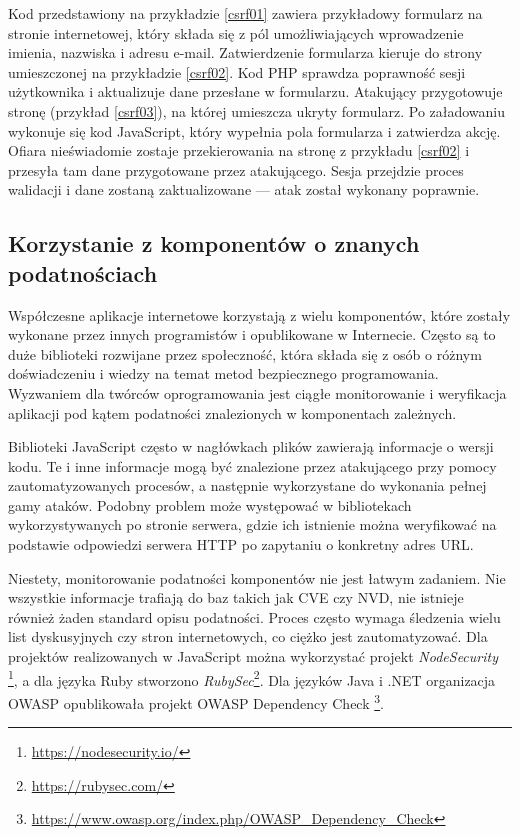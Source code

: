 \documentclass[11pt,a4paper,polish,thesis]{dcsbook}
\begin{document}
Kod przedstawiony na przykładzie \ref{csrf01} zawiera przykładowy formularz na stronie internetowej, który składa się z pól umożliwiających wprowadzenie imienia, nazwiska i adresu e-mail. Zatwierdzenie formularza kieruje do strony umieszczonej na przykładzie \ref{csrf02}. Kod PHP sprawdza poprawność sesji użytkownika i aktualizuje dane przesłane w formularzu. Atakujący przygotowuje stronę (przykład \ref{csrf03}), na której umieszcza ukryty formularz. Po załadowaniu wykonuje się kod JavaScript, który wypełnia pola formularza i zatwierdza akcję. Ofiara nieświadomie zostaje przekierowania na stronę z przykładu \ref{csrf02} i przesyła tam dane przygotowane przez atakującego. Sesja przejdzie proces walidacji i dane zostaną zaktualizowane --- atak został wykonany poprawnie.

\subsection{Korzystanie z komponentów o znanych podatnościach}
Współczesne aplikacje internetowe korzystają z wielu komponentów, które zostały wykonane przez innych programistów i opublikowane w Internecie. Często są to duże biblioteki rozwijane przez społeczność, która składa się z osób o różnym doświadczeniu i wiedzy na temat metod bezpiecznego programowania. Wyzwaniem dla twórców oprogramowania jest ciągłe monitorowanie i weryfikacja aplikacji pod kątem podatności znalezionych w komponentach zależnych. 

Biblioteki JavaScript często w nagłówkach plików zawierają informacje o wersji kodu. Te i inne informacje mogą być znalezione przez atakującego przy pomocy zautomatyzowanych procesów, a następnie wykorzystane do wykonania pełnej gamy ataków. Podobny problem może występować w bibliotekach wykorzystywanych po stronie serwera, gdzie ich istnienie można weryfikować na podstawie odpowiedzi serwera HTTP po zapytaniu o konkretny adres URL. 

Niestety, monitorowanie podatności komponentów nie jest łatwym zadaniem. Nie wszystkie informacje trafiają do baz takich jak CVE czy NVD, nie istnieje również żaden standard opisu podatności. Proces często wymaga śledzenia wielu list dyskusyjnych czy stron internetowych, co ciężko jest zautomatyzować. Dla projektów realizowanych w JavaScript można wykorzystać projekt \textit{NodeSecurity} \footnote{\url{https://nodesecurity.io/}}, a dla języka Ruby stworzono \textit{RubySec}\footnote{\url{https://rubysec.com/}}. Dla języków Java i .NET organizacja OWASP opublikowała projekt OWASP Dependency Check \footnote{\url{https://www.owasp.org/index.php/OWASP\_Dependency\_Check}}.
\end{document}
